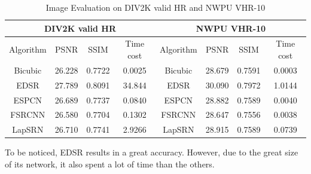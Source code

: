 \documentclass{article}
\begin{document}
  \begin{table}[H]
      \centering
      \makeatletter{}\makeatother\caption{Image Evaluation on DIV2K valid HR and NWPU VHR-10}
      \begin{tabular}{cccc|cccc}
      \hline
      \multicolumn{4}{c|}{DIV2K valid HR}      & \multicolumn{4}{c}{NWPU VHR-10}\\\hline
      Algorithm & PSNR   & SSIM   & Time cost  & Algorithm & PSNR   & SSIM   & Time cost  \\ \hline
      Bicubic   & 26.228 & 0.7722 & 0.0025     & Bicubic   & 28.679 & 0.7591 & 0.0003     \\ \hline
      EDSR      & 27.789 & 0.8091 & 34.844     & EDSR      & 30.090 & 0.7972 & 1.0144     \\ \hline
      ESPCN     & 26.689 & 0.7737 & 0.0840     & ESPCN     & 28.882 & 0.7589 & 0.0040     \\ \hline
      FSRCNN    & 26.580 & 0.7704 & 0.1302     & FSRCNN    & 28.647 & 0.7556 & 0.0038     \\ \hline
      LapSRN    & 26.710 & 0.7741 & 2.9266     & LapSRN    & 28.915 & 0.7589 & 0.0739     \\ \hline
      \end{tabular} 
  \end{table}

  To be noticed, EDSR results in a great accuracy. 
  However, due to the great size of its network, it also spent a lot of time than the others.
  
\end{document}
